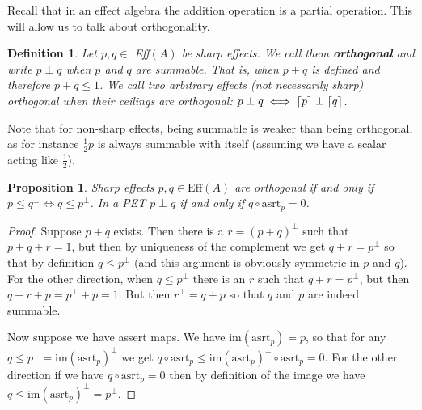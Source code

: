 \documentclass[a4paper,onecolumn,10pt,accepted=2019-05-03, issue=1, volume=1, shorttitle=papers/compositionality-1-1]{compositionalityarticle}
\DeclarePairedDelimiter{\ceil}{\lceil}{\rceil}
\newcounter{counter}
\numberwithin{counter}{section}
\newtheorem{proposition}[counter]{Proposition}
\newtheorem{definition}[counter]{Definition}
\newcommand{\asrt}{\text{asrt}}
\newcommand{\pred}{\text{Eff}}
\newcommand{\im}[1]{\text{im}(#1)}
\begin{document}
\noindent Recall that in an effect algebra the addition operation is a partial operation. This will allow us to talk about orthogonality.
\begin{definition}
	Let $p,q\in$ Eff$(A)$ be sharp effects. We call them \textbf{orthogonal} and write $p\perp q$ when $p$ and $q$ are summable. That is, when $p+q$ is defined and therefore $p+q\leq 1$. We call two arbitrary effects (not necessarily sharp) orthogonal when their ceilings are orthogonal: $p\perp q \iff \ceil{p}\perp \ceil{q}$.
\end{definition}
Note that for non-sharp effects, being summable is weaker than being orthogonal, as for instance $\frac12 p$ is always summable with itself (assuming we have a scalar acting like $\frac12$).
\begin{proposition}\label{prop:orthog}
	Sharp effects $p,q\in\pred(A)$ are orthogonal if and only if $p\leq q^\perp \iff q\leq p^\perp$. In a PET $p\perp q$ if and only if $q\circ \asrt_p = 0$.
\end{proposition}
\begin{proof}
	Suppose $p+q$ exists. Then there is a $r=(p+q)^\perp$ such that $p+q+r = 1$, but then by uniqueness of the complement we get $q+r=p^\perp$ so that by definition $q\leq p^\perp$ (and this argument is obviously symmetric in $p$ and $q$). For the other direction, when $q\leq p^\perp$ there is an $r$ such that $q+r=p^\perp$, but then $q+r+p = p^\perp+p = 1$. But then $r^\perp = q+p$ so that $q$ and $p$ are indeed summable.

	Now suppose we have assert maps. We have $\im{\asrt_p} = p$, so that for any $q\leq p^\perp =\im{\asrt_p}^\perp$ we get $q\circ \asrt_p \leq \im{\asrt_p}^\perp\circ \asrt_p = 0$. For the other direction if we have $q\circ \asrt_p = 0$ then by definition of the image we have $q\leq \im{\asrt_p}^\perp =p^\perp$.
\end{proof}

\end{document}
